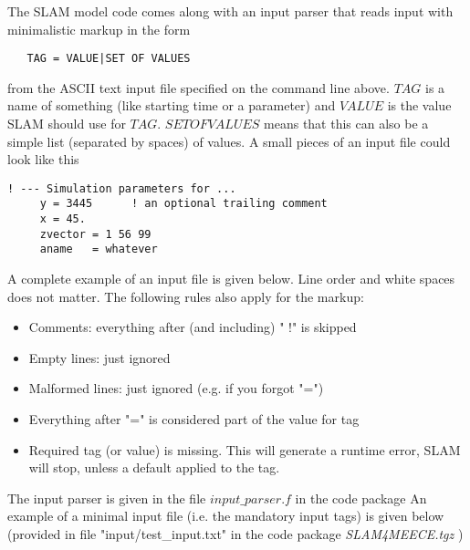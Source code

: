 The SLAM model code comes along with an input parser
that reads input with minimalistic markup in the form
\begin{verbatim}
   TAG = VALUE|SET OF VALUES
\end{verbatim}
from the ASCII text input file specified on the command line above.
$TAG$ is a name of something (like starting time or a parameter) and 
$VALUE$ is the value SLAM should use for $TAG$. $SET OF VALUES$ means
that this can also be a simple list (separated by spaces) of values.
A small pieces of an input file could look like this
\begin{verbatim}
! --- Simulation parameters for ... 
     y = 3445      ! an optional trailing comment
     x = 45.      
     zvector = 1 56 99
     aname   = whatever 
\end{verbatim}
A complete example of an input file is given below. 
Line order and white spaces does not matter. The following rules also
apply for the markup:
\begin{itemize}
  \item Comments: everything after (and including) " !" is skipped
  \item Empty lines:   just ignored
  \item Malformed lines: just ignored (e.g. if you forgot "=")
  \item Everything after "=" is considered part of the value for tag
  \item Required tag (or value) is missing. This will generate a runtime
        error, SLAM will stop, unless a default applied to the tag.
\end{itemize}  
The input parser is given in the file $input\_parser.f$ in the code package
An example of a minimal input file (i.e. the mandatory input tags) is given below
(provided in file "input/test\_input.txt" in the code package {\it SLAM4MEECE.tgz}
)
